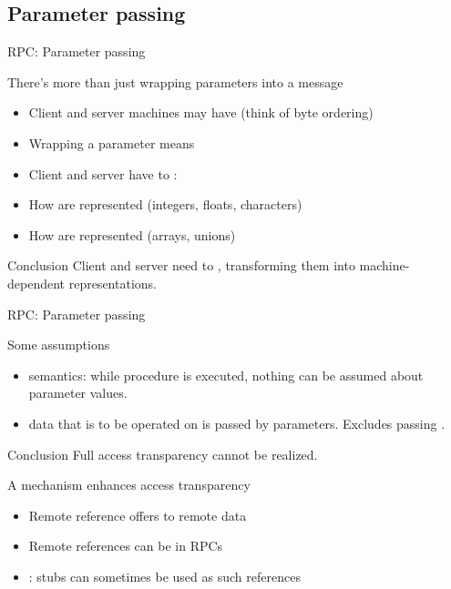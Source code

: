 \subsection{Parameter passing}
\begin{slide}{RPC: Parameter passing}
  \begin{block}{There's more than just wrapping parameters into a message}
    \begin{itemize}\tightlist
    \item Client and server machines may have  (think of byte ordering)
    \item Wrapping a parameter means 
    \item Client and server have to :
    \end{itemize}
    \begin{itemize}\tightlist
    \item How are  represented (integers, floats, characters)
    \item How are  represented (arrays, unions)
    \end{itemize}
  \end{block}
  \begin{alertblock}{Conclusion}
    Client and server need to , transforming them into machine-dependent
    representations. 
  \end{alertblock}
\end{slide}
\begin{slide}{RPC: Parameter passing}
  \begin{block}{Some assumptions}
      \begin{itemize}\tightlist
      \item {} semantics: while procedure is executed, nothing can be assumed about parameter
        values.
      \item {} data that is to be operated on is passed by parameters. Excludes passing
        .
      \end{itemize}
  \end{block}
  \begin{alertblock}{Conclusion} 
    Full access transparency cannot be realized.
  \end{alertblock}
  \begin{block}{A  mechanism enhances access transparency}
    \begin{itemize}\tightlist
    \item Remote reference offers  to remote data
    \item Remote references can be  in RPCs
    \item {}: stubs can sometimes be used as such references
    \end{itemize}
  \end{block}
\end{slide}
